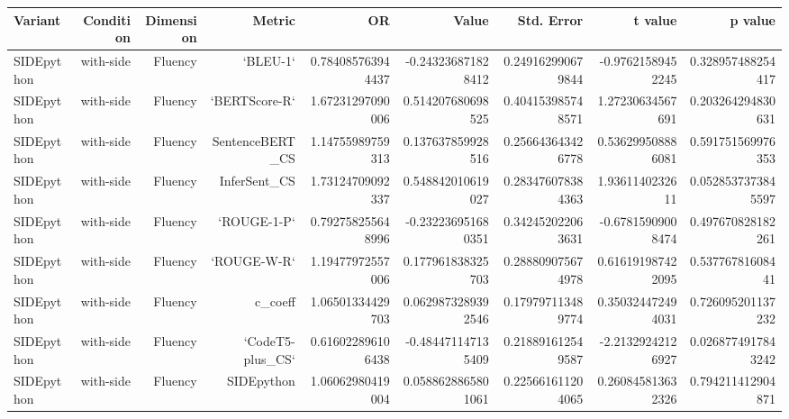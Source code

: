 \begin{tabular}{lrrrrrrrr}
\hline
Variant & Condition & Dimension & Metric & OR & Value & Std. Error & t value & p value
\\
\hline
SIDEpython & with-side & Fluency & `BLEU-1` & 0.784085763944437 & -0.243236871828412 & 0.249162990679844 & -0.97621589452245 & 0.328957488254417
\\
SIDEpython & with-side & Fluency & `BERTScore-R` & 1.67231297090006 & 0.514207680698525 & 0.404153985748571 & 1.27230634567691 & 0.203264294830631
\\
SIDEpython & with-side & Fluency & SentenceBERT\_CS & 1.14755989759313 & 0.137637859928516 & 0.256643643426778 & 0.536299508886081 & 0.591751569976353
\\
SIDEpython & with-side & Fluency & InferSent\_CS & 1.73124709092337 & 0.548842010619027 & 0.283476078384363 & 1.9361140232611 & 0.0528537373845597
\\
SIDEpython & with-side & Fluency & `ROUGE-1-P` & 0.792758255648996 & -0.232236951680351 & 0.342452022063631 & -0.67815909008474 & 0.497670828182261
\\
SIDEpython & with-side & Fluency & `ROUGE-W-R` & 1.19477972557006 & 0.177961838325703 & 0.288809075674978 & 0.616191987422095 & 0.53776781608441
\\
SIDEpython & with-side & Fluency & c\_coeff & 1.06501334429703 & 0.0629873289392546 & 0.179797113489774 & 0.350324472494031 & 0.726095201137232
\\
SIDEpython & with-side & Fluency & `CodeT5-plus\_CS` & 0.616022896106438 & -0.484471147135409 & 0.218891612549587 & -2.21329242126927 & 0.0268774917843242
\\
SIDEpython & with-side & Fluency & SIDEpython & 1.06062980419004 & 0.0588628865801061 & 0.225661611204065 & 0.260845813632326 & 0.794211412904871
\\
\hline
\end{tabular}
